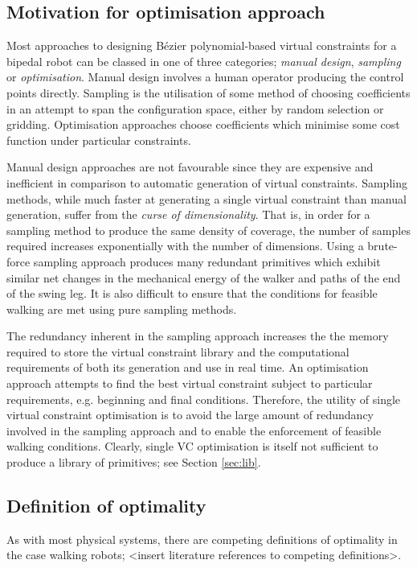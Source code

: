 \subsection{Motivation for optimisation approach}
Most approaches to designing Bézier polynomial-based virtual constraints for a bipedal robot can be classed in one of three categories; \textit{manual design}, \textit{sampling} or \textit{optimisation}. Manual design involves a human operator producing the control points directly. Sampling is the utilisation of some method of choosing coefficients in an attempt to span the configuration space, either by random selection or gridding. Optimisation approaches choose coefficients which minimise some cost function under particular constraints.

Manual design approaches are not favourable since they are expensive and inefficient in comparison to automatic generation of virtual constraints. Sampling methods, while much faster at generating a single virtual constraint than manual generation, suffer from the \textit{curse of dimensionality}. That is, in order for a sampling method to produce the same density of coverage, the number of samples required increases exponentially with the number of dimensions. Using a brute-force sampling approach produces many redundant primitives which exhibit similar net changes in the mechanical energy of the walker and paths of the end of the swing leg. It is also difficult to ensure that the conditions for feasible walking are met using pure sampling methods.

The redundancy inherent in the sampling approach increases the the memory required to store the virtual constraint library and the computational requirements of both its generation and use in real time. An optimisation approach attempts to find the best virtual constraint subject to particular requirements, e.g. beginning and final conditions. Therefore, the utility of single virtual constraint optimisation is to avoid the large amount of redundancy involved in the sampling approach and to enable the enforcement of feasible walking conditions. Clearly, single VC optimisation is itself not sufficient to produce a library of primitives; see Section \ref{sec:lib}.

\subsection{Definition of optimality}
As with most physical systems, there are competing definitions of optimality in the case walking robots; {\color{red}<insert literature references to competing definitions>}.

